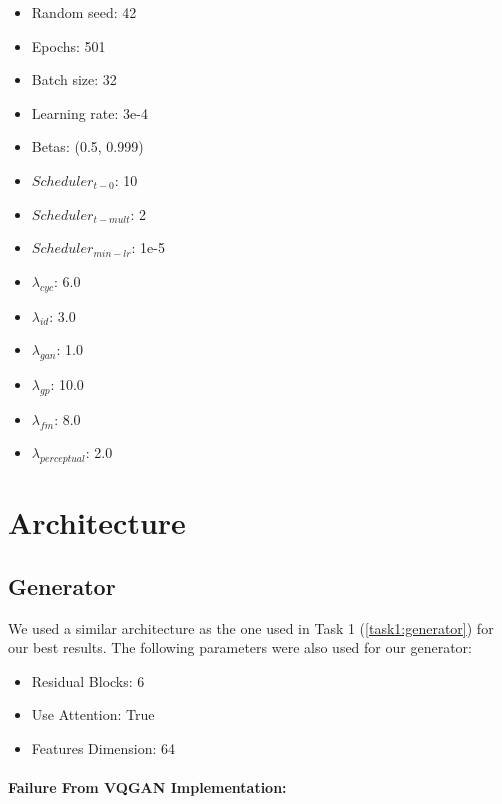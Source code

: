 \documentclass[twoside,english,notitlepage]{report}
\begin{document}
\begin{multicols}{3}
    \begin{itemize}
        \item Random seed: 42
        \item Epochs: 501
        \item Batch size: 32
        \item Learning rate: 3e-4
        \item Betas: (0.5, 0.999)
        \item $Scheduler_{t-0}$: 10
        \item $Scheduler_{t-mult}$: 2
        \item $Scheduler_{min-lr}$: 1e-5
        \item $\lambda_{cyc}$: 6.0
        \item $\lambda_{id}$: 3.0
        \item $\lambda_{gan}$: 1.0
        \item $\lambda_{gp}$: 10.0
        \item $\lambda_{fm}$: 8.0
        \item $\lambda_{perceptual}$: 2.0
    \end{itemize}
\end{multicols}



\section{Architecture}
\subsection{Generator}\label{task2:generator}
We used a similar architecture as the one used in Task 1 (\ref{task1:generator}) for our best results. The following parameters were also used for our generator:

\begin{multicols}{3}
    \begin{itemize}
        \item Residual Blocks: 6
        \item Use Attention: True
        \item Features Dimension: 64
    \end{itemize}
\end{multicols}

\paragraph{Failure From VQGAN Implementation:} 
\end{document}
